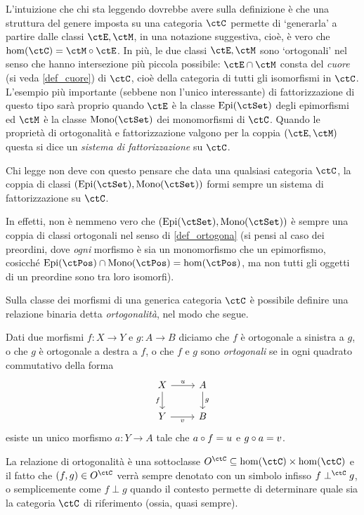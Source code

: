 L'intuizione che chi sta leggendo dovrebbe avere sulla definizione è che una struttura del genere imposta su una categoria \(\ctC\) permette di `generarla' a partire dalle classi \(\ctE,\ctM\), in una notazione suggestiva, cioè, è vero che \(\hom(\ctC) = \ctM\cmp \ctE\). In più, le due classi \(\ctE,\ctM\) sono `ortogonali' nel senso che hanno intersezione più piccola possibile: \(\ctE\cap \ctM\) consta del \emph{cuore} (si veda \ref{def_cuore}) di \(\ctC\), cioè della categoria di tutti gli isomorfismi in \(\ctC\).
\color{red}
L'esempio più importante (sebbene non l'unico interessante) di fattorizzazione di questo tipo sarà proprio quando \(\ctE\) è la classe \(\Epi\) degli epimorfismi ed \(\ctM\) è la classe \(\Mono\) dei monomorfismi di \(\ctC\). Quando le proprietà di ortogonalità e fattorizzazione valgono per la coppia \((\ctE,\ctM)\) questa si dice un \emph{sistema di fattorizzazione} su \(\ctC\).
\begin{remark}
	Chi legge non deve con questo pensare che data una qualsiasi categoria \(\ctC\), la coppia di classi \((\Epi,\Mono)\) formi sempre un sistema di fattorizzazione su \(\ctC\).

	In effetti, non è nemmeno vero che \((\Epi,\Mono)\) è sempre una coppia di classi ortogonali nel senso di \ref{def_ortogona} (si pensi al caso dei preordini, dove \emph{ogni} morfismo è sia un monomorfismo che un epimorfismo, cosicché \(\Epi[\ctPos]\cap\Mono[\ctPos]=\hom(\ctPos)\), ma non tutti gli oggetti di un preordine sono tra loro isomorfi).
\end{remark}
\color{black}
Sulla classe dei morfismi di una generica categoria \(\ctC\) è possibile definire una relazione binaria detta \emph{ortogonalità}, nel modo che segue.
\begin{definition}\label{def_ortogona}
	Dati due morfismi \(f : X\to Y\) e \(g : A\to B\) diciamo che \(f\) è ortogonale a sinistra a \(g\), o che \(g\) è ortogonale a destra a \(f\), o che \(f\) e \(g\) sono \emph{ortogonali} se in ogni quadrato commutativo della forma
	\[
		\begin{tikzcd}
			X \ar[d, "f"']\ar[r, "u"]& A\ar[d, "g"] \\
			Y \ar[r, "v"']& B
		\end{tikzcd}
	\]
	esiste un unico morfismo \(a : Y\to A\) tale che \(a\circ f=u\) e \(g\circ a=v\).
\end{definition}
La relazione di ortogonalità è una sottoclasse \(O^\ctC \subseteq \hom(\ctC)\times\hom(\ctC)\) e il fatto che \((f,g)\in O^\ctC\) verrà sempre denotato con un simbolo infisso \(f\perp^\ctC g\), o semplicemente come \(f\perp g\) quando il contesto permette di determinare quale sia la categoria \(\ctC\) di riferimento (ossia, quasi sempre).

